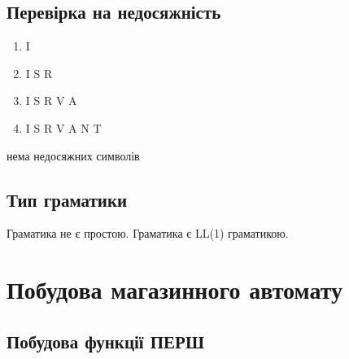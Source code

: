 \subsection{Перевірка на недосяжність}
\begin{enumerate}
    \item  I
    \item  I S R
    \item  I S R V A
    \item  I S R V A N T
\end{enumerate}
нема недосяжних символів

\subsection{Тип граматики}
Граматика не є простою. Граматика є LL(1) граматикою.

\newpage
\section{Побудова магазинного автомату}
\subsection{Побудова функції ПЕРШ}

